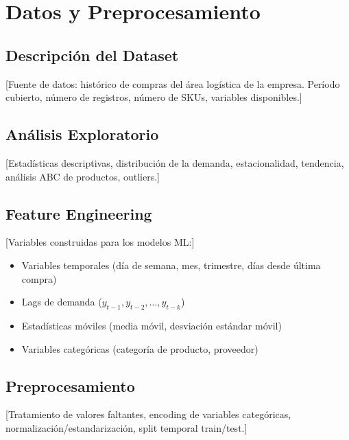 \section{Datos y Preprocesamiento}
\label{sec:data}

\subsection{Descripci\'{o}n del Dataset}
\label{subsec:dataset}

[Fuente de datos: hist\'{o}rico de compras del \'{a}rea log\'{i}stica de la empresa. Per\'{i}odo cubierto, n\'{u}mero de registros, n\'{u}mero de SKUs, variables disponibles.]

\subsection{An\'{a}lisis Exploratorio}
\label{subsec:eda}

[Estad\'{i}sticas descriptivas, distribuci\'{o}n de la demanda, estacionalidad, tendencia, an\'{a}lisis ABC de productos, outliers.]

\subsection{Feature Engineering}
\label{subsec:features}

[Variables construidas para los modelos ML:]
\begin{itemize}
    \item Variables temporales (d\'{i}a de semana, mes, trimestre, d\'{i}as desde \'{u}ltima compra)
    \item Lags de demanda ($y_{t-1}, y_{t-2}, \ldots, y_{t-k}$)
    \item Estad\'{i}sticas m\'{o}viles (media m\'{o}vil, desviaci\'{o}n est\'{a}ndar m\'{o}vil)
    \item Variables categ\'{o}ricas (categor\'{i}a de producto, proveedor)
\end{itemize}

\subsection{Preprocesamiento}
\label{subsec:preprocessing}

[Tratamiento de valores faltantes, encoding de variables categ\'{o}ricas, normalizaci\'{o}n/estandarizaci\'{o}n, split temporal train/test.]
